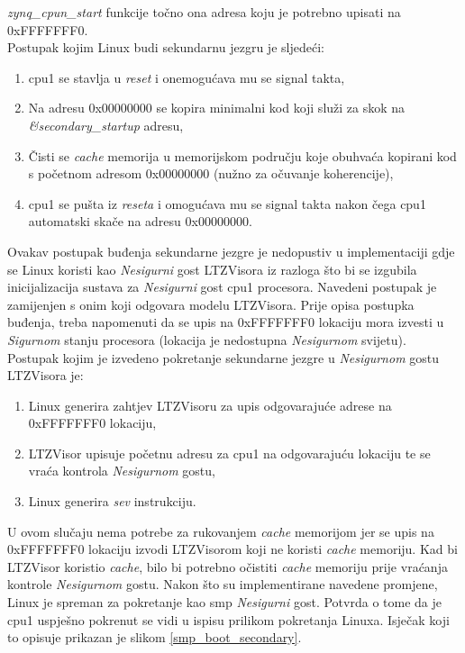 \documentclass[times, utf8, diplomski, numeric]{fer}
\begin{document}
\textit{zynq\_cpun\_start} funkcije točno ona adresa koju je potrebno upisati na 0xFFFFFFF0.\\
Postupak kojim Linux budi sekundarnu jezgru je sljedeći:
\begin{enumerate}
  \item{\gls{cpu}1 se stavlja u \textit{reset} i onemogućava mu se signal takta,}
  \item{Na adresu 0x00000000 se kopira minimalni kod koji služi za skok na \textit{\&secondary\_startup} adresu,}
  \item{Čisti se \textit{cache} memorija u memorijskom području koje obuhvaća kopirani kod s početnom adresom
  0x00000000 (nužno za očuvanje koherencije),}
  \item{\gls{cpu}1 se pušta iz \textit{reseta} i omogućava mu se signal takta nakon čega \gls{cpu}1 automatski skače na adresu
  0x00000000.}
\end{enumerate}
Ovakav postupak buđenja sekundarne jezgre je nedopustiv u implementaciji gdje se Linux koristi kao \textit{Nesigurni} gost
LTZVisora iz razloga što bi se izgubila inicijalizacija sustava za \textit{Nesigurni} gost \gls{cpu}1 procesora. Navedeni postupak
je zamijenjen s onim koji odgovara modelu LTZVisora. Prije opisa postupka buđenja, treba napomenuti da se upis na
0xFFFFFFF0 lokaciju mora izvesti u \textit{Sigurnom} stanju procesora (lokacija je nedostupna \textit{Nesigurnom}
svijetu). Postupak kojim je izvedeno pokretanje sekundarne jezgre u \textit{Nesigurnom} gostu LTZVisora je:
\begin{enumerate}
  \item {Linux generira zahtjev LTZVisoru za upis odgovarajuće adrese na 0xFFFFFFF0 lokaciju,}
  \item{LTZVisor upisuje početnu adresu za \gls{cpu}1 na odgovarajuću lokaciju te se vraća kontrola \textit{Nesigurnom} gostu,}
  \item{Linux generira \textit{sev} instrukciju.}
\end{enumerate}
U ovom slučaju nema potrebe za rukovanjem \textit{cache} memorijom jer se upis na 0xFFFFFFF0 lokaciju izvodi
LTZVisorom koji ne koristi \textit{cache} memoriju. Kad bi LTZVisor koristio \textit{cache}, bilo bi potrebno očistiti
\textit{cache} memoriju prije vraćanja kontrole \textit{Nesigurnom} gostu. Nakon što su implementirane navedene promjene,
Linux je spreman za pokretanje kao \gls{smp} \textit{Nesigurni} gost. Potvrda o tome da je \gls{cpu}1 uspješno pokrenut se vidi u ispisu
prilikom pokretanja Linuxa. Isječak koji to opisuje prikazan je slikom \ref{smp_boot_secondary}.
\end{document}
